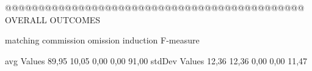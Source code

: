 @@@@@@@@@@@@@@@@@@@@@@@@@@@@@@@@@@@@@@@@@@@@@ OVERALL OUTCOMES

                matching commission   omission  induction   F-measure

avg Values       89,95       10,05       0,00       0,00       91,00        
stdDev Values    12,36       12,36       0,00       0,00        11,47        

